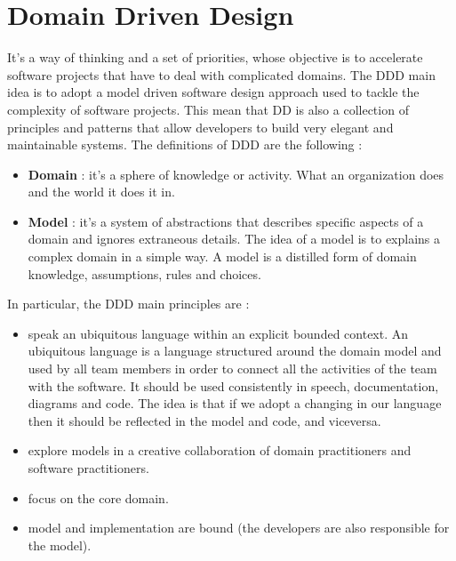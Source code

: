 \section{Domain Driven Design}
It's a way of thinking and a set of priorities, whose objective is to accelerate software projects that have to deal with complicated domains. The DDD main idea is to adopt a model driven software design approach used to tackle the complexity of software projects. This mean that DD is also a collection of principles and patterns that allow developers to build very elegant and maintainable systems. The definitions of DDD are the following :
\begin{itemize}
    \item \textbf{Domain} : it's a sphere of knowledge or activity. What an organization does and the world it does it in.
    \item \textbf{Model} : it's a system of abstractions that describes specific aspects of a domain and ignores extraneous details. The idea of a model is to explains a complex domain in a simple way. A model is a distilled form of domain knowledge, assumptions, rules and choices.
\end{itemize}
In particular, the DDD main principles are :
\begin{itemize}
    \item speak an ubiquitous language within an explicit bounded context. An ubiquitous language is a language structured around the domain model and used by all team members in order to connect all the activities of the team with the software. It should be used consistently in speech, documentation, diagrams and code. The idea is that if we adopt a changing in our language then it should be reflected in the model and code, and viceversa.
    \item explore models in a creative collaboration of domain practitioners and software practitioners.
    \item focus on the core domain.
    \item model and implementation are bound (the developers are also responsible for the model).
\end{itemize}
